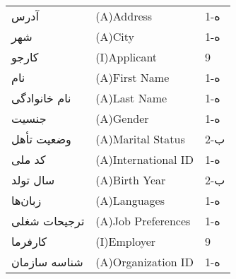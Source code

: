 \documentclass[12pt]{article}
\begin{document}
\begin{table}[]
\begin{tabular}{lll}
			آدرس                                 & (A)Address                                                                                                    & 1-ه   \\
			شهر                                  & (A)City                                                                                                       & 1-ه   \\
			کارجو                                & (I)Applicant                                                                                                  & 9     \\
			نام                                  & (A)First Name                                                                                                 & 1-ه   \\
			نام خانوادگی                         & (A)Last Name                                                                                                  & 1-ه   \\
			جنسیت                                & (A)Gender                                                                                                     & 1-ه   \\
			وضعیت تأهل                           & (A)Marital Status                                                                                             & 2-ب   \\
			کد ملی                               & (A)International ID                                                                                           & 1-ه   \\
			سال تولد                             & (A)Birth Year                                                                                                 & 2-ب   \\
			زبان‌ها                              & (A)Languages                                                                                                  & 1-ه   \\
			ترجیحات شغلی                         & (A)Job Preferences                                                                                            & 1-ه   \\
			کارفرما                              & (I)Employer                                                                                                   & 9     \\
			شناسه سازمان                         & (A)Organization ID                                                                                            & 1-ه   \\

\end{tabular}
\end{table}
\end{document}
